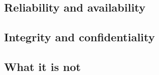 
\subsection{Reliability and availability}
\subsection{Integrity and confidentiality}
\subsection{What it is not}
